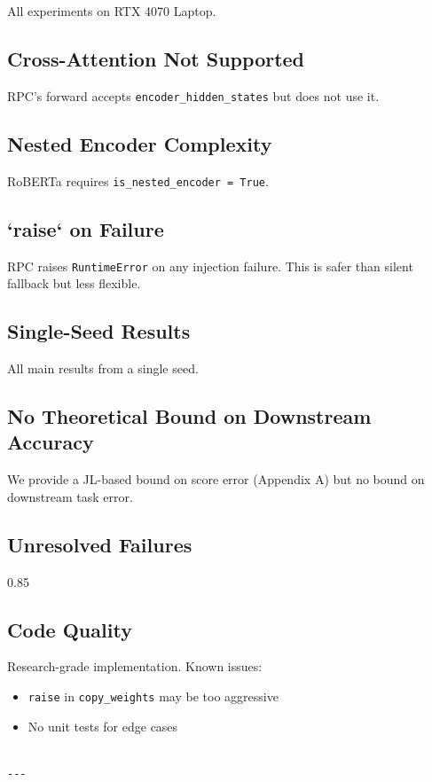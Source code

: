 All experiments on RTX 4070 Laptop.

\subsection{Cross-Attention Not Supported}

RPC's forward accepts \texttt{encoder\_hidden\_states} but does not use it.

\subsection{Nested Encoder Complexity}

RoBERTa requires \texttt{is\_nested\_encoder = True}.

\subsection{`raise` on Failure}

RPC raises \texttt{RuntimeError} on any injection failure. This is safer than 
silent fallback but less flexible.

\subsection{Single-Seed Results}

All main results from a single seed.

\subsection{No Theoretical Bound on Downstream Accuracy}

We provide a JL-based bound on score error (Appendix A) but no bound on 
downstream task error.

\subsection{Unresolved Failures}

0.85

\subsection{Code Quality}

Research-grade implementation. Known issues:
\begin{itemize}
\item \texttt{raise} in \texttt{copy\_weights} may be too aggressive
\item No unit tests for edge cases
\end{itemize}
\begin{lstlisting}

---
\end{lstlisting}